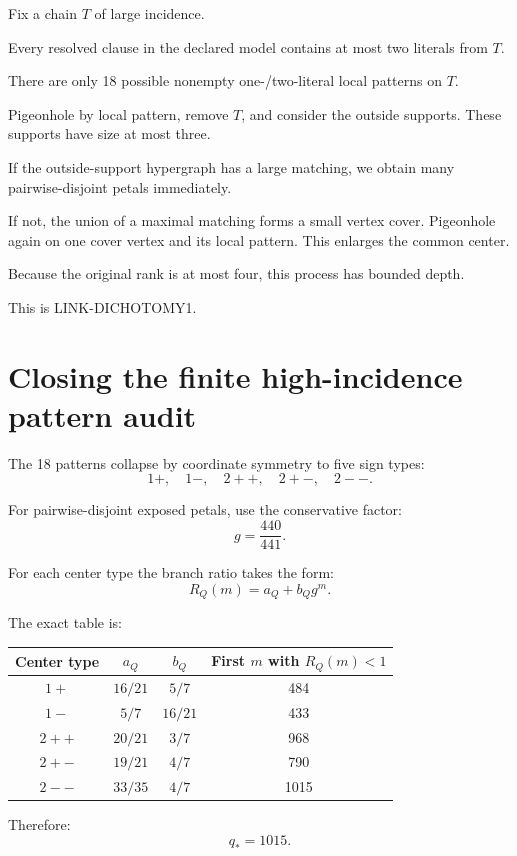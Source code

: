 \documentclass[11pt]{article}
\theoremstyle{plain}
\theoremstyle{definition}
\theoremstyle{remark}
\begin{document}
Fix a chain \(T\) of large incidence.

Every resolved clause in the declared model contains at most two literals from
\(T\).

There are only 18 possible nonempty one-/two-literal local patterns on \(T\).

Pigeonhole by local pattern, remove \(T\), and consider the outside supports.
These supports have size at most three.

If the outside-support hypergraph has a large matching, we obtain many
pairwise-disjoint petals immediately.

If not, the union of a maximal matching forms a small vertex cover.  Pigeonhole
again on one cover vertex and its local pattern.  This enlarges the common
center.

Because the original rank is at most four, this process has bounded depth.

This is LINK-DICHOTOMY1.

\section{Closing the finite high-incidence pattern audit}

The 18 patterns collapse by coordinate symmetry to five sign types:
\[
1+,\quad 1-,\quad 2++,\quad 2+-,\quad 2--.
\]

For pairwise-disjoint exposed petals, use the conservative factor:
\[
g=\frac{440}{441}.
\]

For each center type the branch ratio takes the form:
\[
R_Q(m)=a_Q+b_Qg^m.
\]

The exact table is:

\begin{center}
\begin{tabular}{c|c|c|c}
\toprule
Center type & \(a_Q\) & \(b_Q\) & First \(m\) with \(R_Q(m)<1\)\\
\midrule
\(1+\) & \(16/21\) & \(5/7\) & 484\\
\(1-\) & \(5/7\) & \(16/21\) & 433\\
\(2++\) & \(20/21\) & \(3/7\) & 968\\
\(2+-\) & \(19/21\) & \(4/7\) & 790\\
\(2--\) & \(33/35\) & \(4/7\) & 1015\\
\bottomrule
\end{tabular}
\end{center}

Therefore:
\[
\boxed{q_*=1015.}
\]
\end{document}
